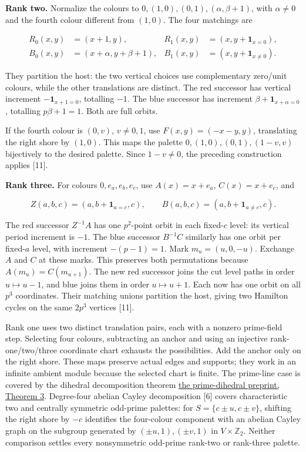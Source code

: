 \documentclass[
  11pt,
]{article}
\begin{document}
\textbf{Rank two.} Normalize the colours to
\(0,(1,0),(0,1),(\alpha,\beta+1)\), with \(\alpha\ne0\) and the fourth
colour different from \((1,0)\). The four matchings are

\[
\begin{aligned}
R_0(x,y)&=(x+1,y),&R_1(x,y)&=(x,y+\mathbf1_{x=0}),\\
B_0(x,y)&=(x+\alpha,y+\beta+1),&
B_1(x,y)&=(x,y+\mathbf1_{x\ne0}).
\end{aligned}
\]

They partition the host: the two vertical choices use complementary
zero/unit colours, while the other translations are distinct. The red
successor has vertical increment \(-\mathbf1_{x+1=0}\), totalling
\(-1\). The blue successor has increment
\(\beta+\mathbf1_{x+\alpha=0}\), totalling \(p\beta+1=1\). Both are full
orbits.

If the fourth colour is \((0,v)\), \(v\ne0,1\), use \(F(x,y)=(-x-y,y)\),
translating the right shore by \((1,0)\). This maps the palette
\(0,(1,0),(0,1),(1-v,v)\) bijectively to the desired palette. Since
\(1-v\ne0\), the preceding construction applies {[}11{]}.

\textbf{Rank three.} For colours \(0,e_a,e_b,e_c\), use \(A(x)=x+e_a\),
\(C(x)=x+e_c\), and

\[
Z(a,b,c)=(a,b+\mathbf1_{a=c},c),\qquad
B(a,b,c)=(a,b+\mathbf1_{a\ne c},c).
\]

The red successor \(Z^{-1}A\) has one \(p^2\)-point orbit in each
fixed-\(c\) level: its vertical period increment is \(-1\). The blue
successor \(B^{-1}C\) similarly has one orbit per fixed-\(a\) level,
with increment \(-(p-1)=1\). Mark \(m_u=(u,0,-u)\). Exchange \(A\) and
\(C\) at these marks. This preserves both permutations because
\(A(m_u)=C(m_{u+1})\). The new red successor joins the cut level paths
in order \(u\mapsto u-1\), and blue joins them in order
\(u\mapsto u+1\). Each now has one orbit on all \(p^3\) coordinates.
Their matching unions partition the host, giving two Hamilton cycles on
the same \(2p^3\) vertices {[}11{]}.

Rank one uses two distinct translation pairs, each with a nonzero
prime-field step. Selecting four colours, subtracting an anchor and
using an injective rank-one/two/three coordinate chart exhausts the
possibilities. Add the anchor only on the right shore. These maps
preserve actual edges and supports; they work in an infinite ambient
module because the selected chart is finite. The prime-line case is
covered by the dihedral decomposition theorem
\href{https://arxiv.org/html/1810.07866v1}{the prime-dihedral preprint,
Theorem 3}. Degree-four abelian Cayley decomposition {[}6{]} covers
characteristic two and centrally symmetric odd-prime palettes: for
\(S=\{c\pm u,c\pm v\}\), shifting the right shore by \(-c\) identifies
the four-colour component with an abelian Cayley graph on the subgroup
generated by \((\pm u,1),(\pm v,1)\) in \(V\times\mathbb Z_2\). Neither
comparison settles every nonsymmetric odd-prime rank-two or rank-three
palette.
\end{document}
